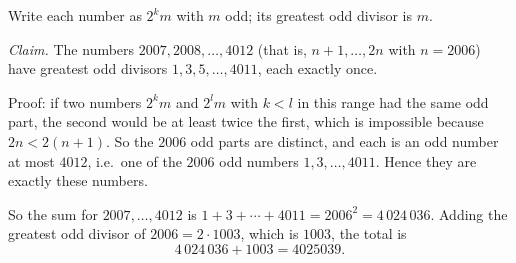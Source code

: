 Write each number as $2^km$ with $m$ odd; its greatest odd divisor is $m$.

\emph{Claim.} The numbers $2007,2008,\dots,4012$ (that is, $n+1,\dots,2n$ with $n=2006$) have greatest odd divisors $1,3,5,\dots,4011$, each exactly once.

Proof: if two numbers $2^km$ and $2^lm$ with $k<l$ in this range had the same odd part, the second would be at least twice the first, which is impossible because $2n<2(n+1)$. So the $2006$ odd parts are distinct, and each is an odd number at most $4012$, i.e.\ one of the $2006$ odd numbers $1,3,\dots,4011$. Hence they are exactly these numbers.

So the sum for $2007,\dots,4012$ is $1+3+\cdots+4011=2006^2=4\,024\,036$. Adding the greatest odd divisor of $2006=2\cdot1003$, which is $1003$, the total is
\[
4\,024\,036+1003=\boxed{4025039}.
\]
